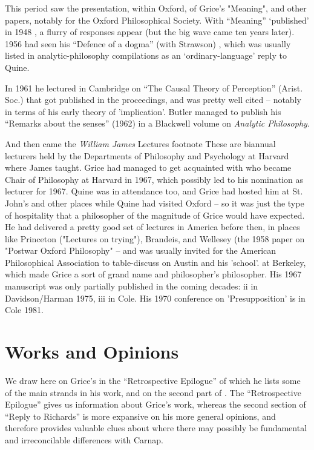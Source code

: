 \documentclass[10pt,titlepage]{book}
\begin{document}
This period saw the presentation, within Oxford, of Grice's "Meaning", and other papers, notably for the Oxford Philosophical Society.
With ``Meaning'' `published' in 1948 \cite{Grice48}, a flurry of responses appear (but the big wave came ten years later).
1956 had seen his ``Defence of a dogma'' (with Strawson) \cite{grice56}, which was usually listed in analytic-philosophy compilations as an `ordinary-language' reply to Quine.

In 1961 he lectured in Cambridge on ``The Causal Theory of Perception'' (Arist. Soc.) that got published in the proceedings, and was pretty well cited -- notably in terms of his early theory of 'implication'.
Butler managed to publish  his ``Remarks about the senses'' (1962) in a Blackwell volume on \emph{Analytic  Philosophy}.

And then came the \emph{William James} Lectures%
footnote{
These are biannual lecturers held by the Departments of Philosophy  and 
Psychology at Harvard where James taught. Grice had managed to get  acquainted 
with who became Chair of Philosophy at Harvard in 1967, which  possibly led 
to his nomination as lecturer for 1967.
Quine was in attendance too, and Grice had hosted him at St. John's and other places while Quine had visited Oxford -- so it was just the type of hospitality that a philosopher of the magnitude of Grice would have expected.
He had delivered a pretty good set of lectures in America before then, in places like Princeton ("Lectures on  
trying"), Brandeis, and Wellesey (the 1958 paper on "Postwar Oxford Philosophy"  -- and was usually invited for the American Philosophical Association to table-discuss on Austin and his 'school'.
}
at Berkeley, which made Grice a sort of grand name and philosopher's philosopher.
His 1967 manuscript was only partially published in the coming decades: ii in Davidson/Harman 1975, iii in  Cole.
His 1970 conference on 'Presupposition' is in Cole 1981.

\section{Works and Opinions}

We draw here on Grice's \cite{grice89} in the ``Retrospective Epilogue'' of which he lists some of the main strands in his work, and on the second part of \cite{grice86b}.
The ``Retrospective Epilogue'' gives us information about Grice's work, whereas the second section of ``Reply to Richards'' is more expansive on his more general opinions, and therefore provides valuable clues about where there may possibly be fundamental and irreconcilable differences with Carnap.
\end{document}
